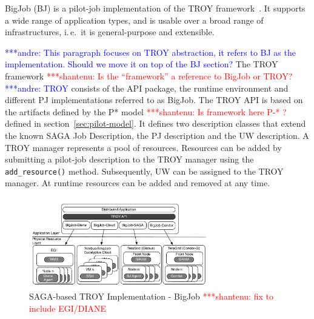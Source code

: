 \documentclass[conference,final]{IEEEtran}
\newcommand{\jhanote}[1]{ {\textcolor{red} { ***shantenu: #1 }}}
\newcommand{\alnote}[1]{ {\textcolor{blue} { ***andre: #1 }}}
\newcommand{\alnote}[1]{}
\newcommand{\jhanote}[1]{}
\begin{document}



BigJob (BJ) is a pilot-job implementation of the TROY
framework~\cite{bigjob_web}. It supports a wide range of application
types, and is usable over a broad range of infrastructures, i.\,e.\ it
is general-purpose and extensible.

\alnote{This paragraph focuses on TROY abstraction, it refers to BJ as the
implementation. Should we move it on top of the BJ section?} The TROY framework
\jhanote{Is the ``framework'' a reference to BigJob or TROY?}\alnote{TROY}
consists of the API package, the runtime environment and different PJ
implementations referred to as BigJob. The TROY API is based on the artifacts
defined by the P* model \jhanote{Is framework here P-* ?} defined in
section~\ref{sec:pilot-model}. It defines two description classes that extend
the known SAGA Job Description, the PJ description and the UW description. A
TROY manager represents a pool of resources. Resources can be added by
submitting a pilot-job description to the TROY manager using the
\texttt{add\_resource()} method. Subsequently, UW can be assigned to the TROY
manager. At runtime resources can be added and removed at any time.


\begin{figure}[htbp]
	\centering
		\includegraphics[width=0.7\textwidth]{figures/distributed_pilot_job.pdf}
	\caption{SAGA-based TROY Implementation - BigJob \jhanote{fix
            to include EGI/DIANE}}
	\label{fig:figures_distributed_pilot_job}
\end{figure}
\end{document}
